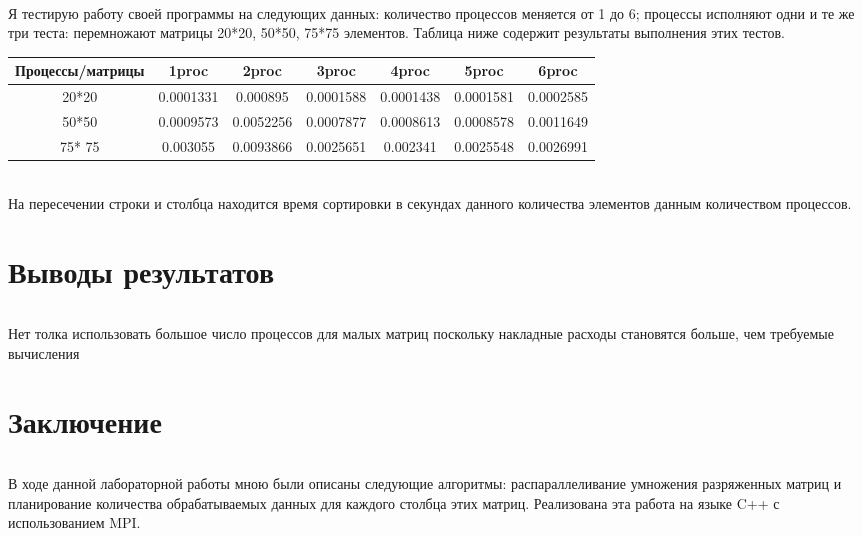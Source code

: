 \documentclass[12pt,a4paper]{article}
\begin{document}
\paragraph{}Я тестирую работу своей программы на следующих данных: количество процессов меняется от 1 до 6; процессы исполняют одни и те же три теста: перемножают матрицы 20*20, 50*50, 75*75 элементов. Таблица ниже содержит результаты выполнения этих тестов.
\begin{center}
\begin{tabular}{||c c c c c c c ||} 
 \hline
 Процессы/матрицы & 1proc & 2proc & 3proc & 4proc & 5proc & 6proc \\ [0.5ex] 
 \hline\hline
 20*20 & 0.0001331 & 0.000895 & 0.0001588 & 0.0001438 & 0.0001581 & 0.0002585\\ 
 \hline
 50*50 & 0.0009573 & 0.0052256 & 0.0007877 & 0.0008613 & 0.0008578 & 0.0011649\\
 \hline
 75* 75 & 0.003055 & 0.0093866 & 0.0025651 & 0.002341 &  0.0025548 & 0.0026991\\
[1ex] 
 \hline
\end{tabular}
\end{center}
\paragraph{}На пересечении строки и столбца находится время сортировки в секундах данного количества элементов данным количеством процессов.

\part*{Выводы результатов}
\paragraph{} Нет толка использовать большое число процессов для малых матриц поскольку накладные расходы становятся больше, чем требуемые вычисления

\part*{Заключение}
\paragraph{}В ходе данной лабораторной работы мною были описаны следующие алгоритмы: распараллеливание умножения разряженных матриц и планирование количества обрабатываемых данных для каждого столбца этих матриц. Реализована эта работа на языке C++ с использованием MPI.
\end{document}
